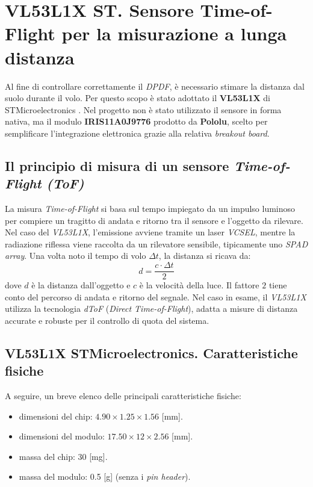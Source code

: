 \documentclass[11pt]{report}
\begin{document}
	\section{VL53L1X ST. Sensore Time-of-Flight per la misurazione a lunga distanza}
	Al fine di controllare correttamente il \textit{DPDF}, è necessario stimare la distanza dal suolo durante il volo. Per questo scopo è stato adottato il \textbf{VL53L1X} di STMicroelectronics \cite{VL53L1XDatasheet}. Nel progetto non è stato utilizzato il sensore in forma nativa, ma il modulo \textbf{IRIS11A0J9776} prodotto da \textbf{Pololu}, scelto per semplificare l'integrazione elettronica grazie alla relativa \textit{breakout board}.
	
	\subsection{Il principio di misura di un sensore \textit{Time-of-Flight (ToF)}}
	La misura \textit{Time-of-Flight} si basa sul tempo impiegato da un impulso luminoso per compiere un tragitto di andata e ritorno tra il sensore e l'oggetto da rilevare. Nel caso del \textit{VL53L1X}, l'emissione avviene tramite un laser \textit{VCSEL}, mentre la radiazione riflessa viene raccolta da un rilevatore sensibile, tipicamente uno \textit{SPAD array}.
	Una volta noto il tempo di volo $\Delta t$, la distanza si ricava da:
	\begin{equation}
		d=\frac{c\cdot \Delta{t}}{2}
	\end{equation}
	dove $d$ è la distanza dall'oggetto e $c$ è la velocità della luce. Il fattore $2$ tiene conto del percorso di andata e ritorno del segnale. Nel caso in esame, il \textit{VL53L1X} utilizza la tecnologia \textit{dToF} (\textit{Direct Time-of-Flight}), adatta a misure di distanza accurate e robuste per il controllo di quota del sistema.
	
	\subsection{VL53L1X STMicroelectronics. Caratteristiche fisiche}
	A seguire, un breve elenco delle principali caratteristiche fisiche:
	\begin{itemize}
		\item dimensioni del chip: $4.90\times 1.25\times 1.56$ [mm].
		\item dimensioni del modulo: $17.50\times 12\times 2.56$ [mm].
		\item massa del chip: 30 [mg].
		\item massa del modulo: 0.5 [g] (senza i \textit{pin header}).
	\end{itemize}
	
\end{document}

